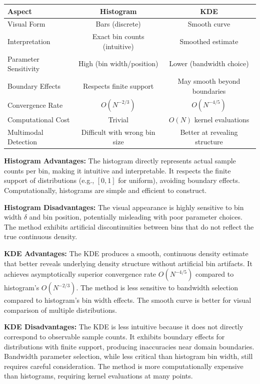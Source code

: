 \documentclass[12pt]{article}
\begin{document}
\begin{center}
    \begin{tabular}{|l|c|c|}
        \hline
        \textbf{Aspect}       & \textbf{Histogram}            & \textbf{KDE}                  \\
        \hline
        Visual Form           & Bars (discrete)               & Smooth curve                  \\
        Interpretation        & Exact bin counts (intuitive)  & Smoothed estimate             \\
        Parameter Sensitivity & High (bin width/position)     & Lower (bandwidth choice)      \\
        Boundary Effects      & Respects finite support       & May smooth beyond boundaries  \\
        Convergence Rate      & $O(N^{-2/3})$                 & $O(N^{-4/5})$                 \\
        Computational Cost    & Trivial                       & $O(N)$ kernel evaluations     \\
        Multimodal Detection  & Difficult with wrong bin size & Better at revealing structure \\
        \hline
    \end{tabular}
\end{center}

\textbf{Histogram Advantages:} The histogram directly represents actual sample counts per bin, making it intuitive and interpretable. It respects the finite support of distributions (e.g., $[0,1]$ for uniform), avoiding boundary effects. Computationally, histograms are simple and efficient to construct.

\textbf{Histogram Disadvantages:} The visual appearance is highly sensitive to bin width $\delta$ and bin position, potentially misleading with poor parameter choices. The method exhibits artificial discontinuities between bins that do not reflect the true continuous density.

\textbf{KDE Advantages:} The KDE produces a smooth, continuous density estimate that better reveals underlying density structure without artificial bin artifacts. It achieves asymptotically superior convergence rate $O(N^{-4/5})$ compared to histogram's $O(N^{-2/3})$. The method is less sensitive to bandwidth selection compared to histogram's bin width effects. The smooth curve is better for visual comparison of multiple distributions.

\textbf{KDE Disadvantages:} The KDE is less intuitive because it does not directly correspond to observable sample counts. It exhibits boundary effects for distributions with finite support, producing inaccuracies near domain boundaries. Bandwidth parameter selection, while less critical than histogram bin width, still requires careful consideration. The method is more computationally expensive than histograms, requiring kernel evaluations at many points.
\end{document}
